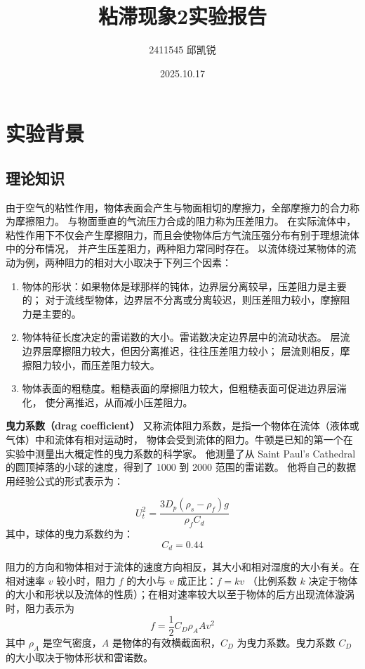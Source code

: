 \documentclass[12pt]{article}
\title{粘滞现象2实验报告}
\author{2411545 邱凯锐}
\date{2025.10.17}
\begin{document}
\maketitle
\section{实验背景}
\subsection{理论知识}
由于空气的粘性作用，物体表面会产生与物面相切的摩擦力，全部摩擦力的合力称为摩擦阻力。
与物面垂直的气流压力合成的阻力称为压差阻力。
在实际流体中，粘性作用下不仅会产生摩擦阻力，而且会使物体后方气流压强分布有别于理想流体中的分布情况，
并产生压差阻力，两种阻力常同时存在。
以流体绕过某物体的流动为例，两种阻力的相对大小取决于下列三个因素：

\begin{enumerate}
  \item 物体的形状：如果物体是球那样的钝体，边界层分离较早，压差阻力是主要的；
        对于流线型物体，边界层不分离或分离较迟，则压差阻力较小，摩擦阻力是主要的。
  \item 物体特征长度决定的雷诺数的大小。雷诺数决定边界层中的流动状态。
        层流边界层摩擦阻力较大，但因分离推迟，往往压差阻力较小；
        层流则相反，摩擦阻力较小，而压差阻力较大。
  \item 物体表面的粗糙度。粗糙表面的摩擦阻力较大，但粗糙表面可促进边界层湍化，
        使分离推迟，从而减小压差阻力。
\end{enumerate}

\textbf{曳力系数（drag coefficient）}
又称流体阻力系数，是指一个物体在流体（液体或气体）中和流体有相对运动时，
物体会受到流体的阻力。牛顿是已知的第一个在实验中测量出大概定性的曳力系数的科学家。
他测量了从 Saint Paul’s Cathedral 的圆顶掉落的小球的速度，得到了 1000 到 2000 范围的雷诺数。
他将自己的数据用经验公式的形式表示为：

\begin{equation}
U_t^2 = \frac{3 D_p (\rho_s - \rho_f) g}{\rho_f C_d}
\end{equation}
其中，球体的曳力系数约为：
\[
C_d = 0.44
\]

阻力的方向和物体相对于流体的速度方向相反，其大小和相对湿度的大小有关。在相对速率 $v$ 较小时，阻力 $f$ 的大小与 $v$ 成正比：$f=kv$ （比例系数 $k$ 决定于物体的大小和形状以及流体的性质）；在相对速率较大以至于物体的后方出现流体漩涡时，阻力表示为
\begin{equation}
    f=\frac 12C_D\rho_A Av^2
\end{equation}
其中 $\rho_A$ 是空气密度，$A$ 是物体的有效横截面积，$C_D$ 为曳力系数。曳力系数 $C_D$ 的大小取决于物体形状和雷诺数。
\end{document}
